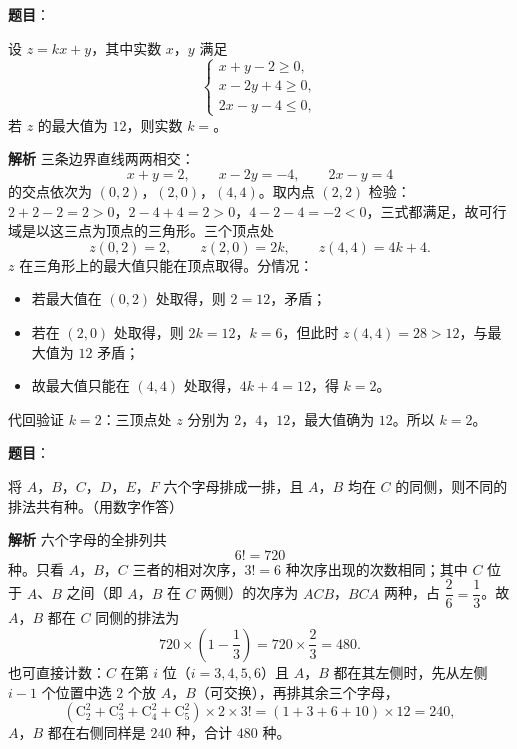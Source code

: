 \begin{answer}

\textbf{题目}：

设 $z=kx+y$，其中实数 $x$，$y$ 满足
\nopagebreak[4]
\[\begin{cases}
x+y-2\geqslant0,\\
x-2y+4\geqslant0,\\
2x-y-4\leqslant0,
\end{cases}\]
若 $z$ 的最大值为 $12$，则实数 $k=$\gkblank{}。

\textbf{解析}
三条边界直线两两相交：
\nopagebreak[4]
\[x+y=2,\qquad x-2y=-4,\qquad 2x-y=4\]
的交点依次为 $(0,2)$，$(2,0)$，$(4,4)$。取内点 $(2,2)$ 检验：$2+2-2=2>0$，$2-4+4=2>0$，$4-2-4=-2<0$，三式都满足，故可行域是以这三点为顶点的三角形。三个顶点处
\nopagebreak[4]
\[z(0,2)=2,\qquad z(2,0)=2k,\qquad z(4,4)=4k+4.\]
$z$ 在三角形上的最大值只能在顶点取得。分情况：
\begin{itemize}
\item 若最大值在 $(0,2)$ 处取得，则 $2=12$，矛盾；
\item 若在 $(2,0)$ 处取得，则 $2k=12$，$k=6$，但此时 $z(4,4)=28>12$，与最大值为 $12$ 矛盾；
\item 故最大值只能在 $(4,4)$ 处取得，$4k+4=12$，得 $k=2$。
\end{itemize}

代回验证 $k=2$：三顶点处 $z$ 分别为 $2$，$4$，$12$，最大值确为 $12$。所以 $k=2$。


\end{answer}
\begin{answer}

\textbf{题目}：

将 $A$，$B$，$C$，$D$，$E$，$F$ 六个字母排成一排，且 $A$，$B$ 均在 $C$ 的同侧，则不同的排法共有\gkblank{}种。（用数字作答）

\textbf{解析}
六个字母的全排列共
\nopagebreak[4]
\[6!=720\]
种。只看 $A$，$B$，$C$ 三者的相对次序，$3!=6$ 种次序出现的次数相同；其中 $C$ 位于 $A$、$B$ 之间（即 $A$，$B$ 在 $C$ 两侧）的次序为 $ACB$，$BCA$ 两种，占 $\dfrac26=\dfrac13$。故 $A$，$B$ 都在 $C$ 同侧的排法为
\nopagebreak[4]
\[720\times\left(1-\frac13\right)=720\times\frac23=480.\]
也可直接计数：$C$ 在第 $i$ 位（$i=3,4,5,6$）且 $A$，$B$ 都在其左侧时，先从左侧 $i-1$ 个位置中选 $2$ 个放 $A$，$B$（可交换），再排其余三个字母，
\nopagebreak[4]
\[\left(\mathrm C_2^2+\mathrm C_3^2+\mathrm C_4^2+\mathrm C_5^2\right)\times2\times3!=(1+3+6+10)\times12=240,\]
$A$，$B$ 都在右侧同样是 $240$ 种，合计 $480$ 种。


\end{answer}
